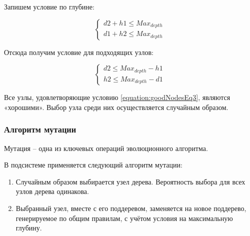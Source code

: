 Запишем условие по глубине:

\begin{equation}
\label{equation:goodNodesEq2}
\begin{cases}d2 + h1 \leq Max_{depth} \\  d1 + h2 \leq Max_{depth} \end{cases}
\end{equation}

\clearpage
Отсюда получим условие для подходящих узлов:

\begin{equation}
\label{equation:goodNodesEq3}
\begin{cases} d2 \leq Max_{depth} - h1 \\ h2 \leq Max_{depth} - d1  \end{cases}
\end{equation}

Все узлы, удовлетворяющие условию \ref{equation:goodNodesEq3}, являются «хорошими». Выбор узла среди них осуществляется случайным образом.

\subsubsection{Алгоритм мутации}

Мутация -- одна из ключевых операций эволюционного алгоритма.

В подсистеме применяется следующий алгоритм мутации:
\begin{enumerate}
\item Случайным образом выбирается узел дерева. Вероятность выбора для всех узлов дерева одинакова.
\item Выбранный узел, вместе с его поддеревом, заменяется на новое поддерево, генерируемое по общим правилам, с учётом условия на максимальную глубину. 
\end{enumerate}

